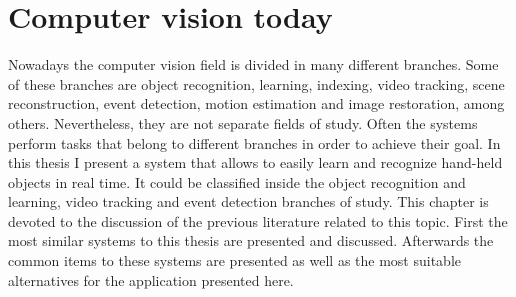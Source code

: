 \section{Computer vision today}

Nowadays the computer vision field is divided in many different branches. 
Some of these branches are object recognition, learning, indexing, video tracking, scene reconstruction, event detection, motion estimation and image restoration, among others. 
Nevertheless, they are not separate fields of study. 
Often the systems perform tasks that belong to different branches in order to achieve their goal. 
In this thesis I present a system that allows to easily learn and recognize hand-held objects in real time. 
It could be classified inside the object recognition and learning, video tracking and event detection branches of study. 
This chapter is devoted to the discussion of the previous literature related to this topic. 
First the most similar systems to this thesis are presented and discussed. 
Afterwards the common items to these systems are presented as well as the most suitable alternatives for the application presented here. 


